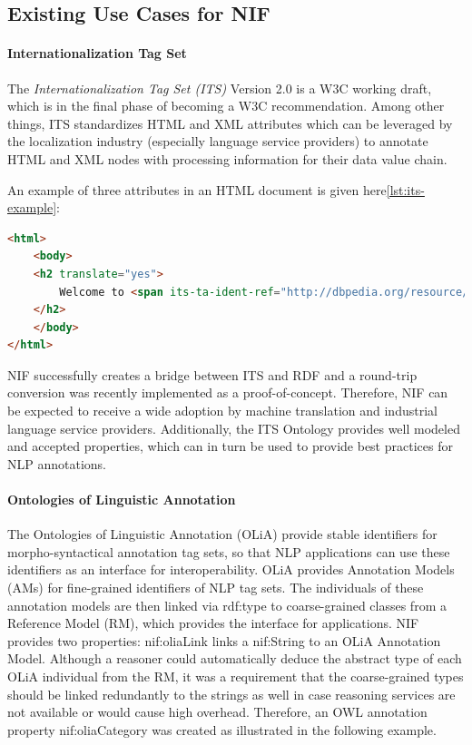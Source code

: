 \documentclass[thesis=M,english,hidelinks]{FITthesis}[2019/12/23]
\begin{document}
\subsection{Existing Use Cases for NIF}

\paragraph{Internationalization Tag Set}
The \textit{Internationalization Tag Set (ITS)} Version 2.0 is a W3C working draft, which is in the final phase of becoming a W3C recommendation. Among other things, ITS standardizes HTML and XML attributes which can be leveraged by the localization industry (especially language service providers) to annotate HTML and XML nodes with processing information for their data value chain.

An example of three attributes in an HTML document is given here\ref{lst:its-example}:

\begin{lstlisting}[language=HTML, caption=Example of Internationalization Tag Set HTML Code, label = {lst:its-example}]
<html> 
	<body>
	<h2 translate="yes"> 
		Welcome to <span its-ta-ident-ref="http://dbpedia.org/resource/Dublin" its-within- text="yes" translate ="no"> Dublin </span> in <b translate ="no" its-within-text="yes"> Ireland </b>! 
	</h2> 
	</body> 
</html>
\end{lstlisting}

NIF successfully creates a bridge between ITS and RDF and a round-trip conversion was recently implemented as a proof-of-concept. Therefore, NIF can be expected to receive a wide adoption by machine translation and industrial language service providers. Additionally, the ITS Ontology provides well modeled and accepted properties, which can in turn be used to provide best practices for NLP annotations.

\paragraph{Ontologies of Linguistic Annotation}

The Ontologies of Linguistic Annotation (OLiA) provide stable identifiers for morpho-syntactical annotation tag sets, so that NLP applications can use these identifiers as an interface for interoperability. OLiA provides Annotation Models (AMs) for fine-grained identifiers of NLP tag sets. The
individuals of these annotation models are then linked via rdf:type to coarse-grained classes from a Reference Model (RM), which provides the interface for applications. NIF provides two properties: nif:oliaLink links a nif:String to an OLiA Annotation Model. Although a reasoner could automatically deduce the abstract type of each OLiA individual from the RM, it was a requirement that the coarse-grained types should be linked redundantly to the strings as well in case reasoning services are not available or would cause high overhead. Therefore, an OWL annotation property nif:oliaCategory was created as illustrated in the following example\cite{lst:olia-example}.
\end{document}
